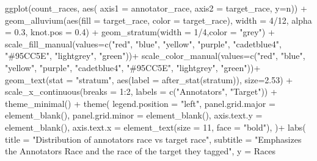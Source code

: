\documentclass[
]{article}
\newenvironment{Shaded}{\begin{snugshade}}{\end{snugshade}}
\newcommand{\AttributeTok}[1]{\textcolor[rgb]{0.77,0.63,0.00}{#1}}
\newcommand{\DecValTok}[1]{\textcolor[rgb]{0.00,0.00,0.81}{#1}}
\newcommand{\FloatTok}[1]{\textcolor[rgb]{0.00,0.00,0.81}{#1}}
\newcommand{\FunctionTok}[1]{\textcolor[rgb]{0.00,0.00,0.00}{#1}}
\newcommand{\NormalTok}[1]{#1}
\newcommand{\SpecialCharTok}[1]{\textcolor[rgb]{0.00,0.00,0.00}{#1}}
\newcommand{\StringTok}[1]{\textcolor[rgb]{0.31,0.60,0.02}{#1}}
\begin{document}
\begin{Shaded}
\begin{Highlighting}[]
\FunctionTok{ggplot}\NormalTok{(count\_races,}
       \FunctionTok{aes}\NormalTok{( }\AttributeTok{axis1 =}\NormalTok{ annotator\_race, }\AttributeTok{axis2 =}\NormalTok{ target\_race, }\AttributeTok{y=}\NormalTok{n)) }\SpecialCharTok{+}
    \FunctionTok{geom\_alluvium}\NormalTok{(}\FunctionTok{aes}\NormalTok{(}\AttributeTok{fill =}\NormalTok{ target\_race, }\AttributeTok{color =}\NormalTok{ target\_race), }
                  \AttributeTok{width =} \DecValTok{4}\SpecialCharTok{/}\DecValTok{12}\NormalTok{, }\AttributeTok{alpha =} \FloatTok{0.3}\NormalTok{, }\AttributeTok{knot.pos =} \FloatTok{0.4}\NormalTok{) }\SpecialCharTok{+}
    \FunctionTok{geom\_stratum}\NormalTok{(}\AttributeTok{width =} \DecValTok{1}\SpecialCharTok{/}\DecValTok{4}\NormalTok{,}\AttributeTok{color =} \StringTok{"grey"}\NormalTok{) }\SpecialCharTok{+}
    \FunctionTok{scale\_fill\_manual}\NormalTok{(}\AttributeTok{values=}\FunctionTok{c}\NormalTok{(}\StringTok{"red"}\NormalTok{, }\StringTok{"blue"}\NormalTok{, }\StringTok{"yellow"}\NormalTok{, }\StringTok{"purple"}\NormalTok{,}
                               \StringTok{"cadetblue4"}\NormalTok{, }\StringTok{"\#95CC5E"}\NormalTok{, }\StringTok{"lightgrey"}\NormalTok{, }\StringTok{"green"}\NormalTok{))}\SpecialCharTok{+}
    \FunctionTok{scale\_color\_manual}\NormalTok{(}\AttributeTok{values=}\FunctionTok{c}\NormalTok{(}\StringTok{"red"}\NormalTok{, }\StringTok{"blue"}\NormalTok{, }\StringTok{"yellow"}\NormalTok{, }\StringTok{"purple"}\NormalTok{,}
                                \StringTok{"cadetblue4"}\NormalTok{, }\StringTok{"\#95CC5E"}\NormalTok{, }\StringTok{"lightgrey"}\NormalTok{, }\StringTok{"green"}\NormalTok{))}\SpecialCharTok{+}
    \FunctionTok{geom\_text}\NormalTok{(}\AttributeTok{stat =} \StringTok{"stratum"}\NormalTok{, }\FunctionTok{aes}\NormalTok{(}\AttributeTok{label =} \FunctionTok{after\_stat}\NormalTok{(stratum)), }\AttributeTok{size=}\FloatTok{2.53}\NormalTok{) }\SpecialCharTok{+}
    \FunctionTok{scale\_x\_continuous}\NormalTok{(}\AttributeTok{breaks =} \DecValTok{1}\SpecialCharTok{:}\DecValTok{2}\NormalTok{, }\AttributeTok{labels =} \FunctionTok{c}\NormalTok{(}\StringTok{"Annotators"}\NormalTok{, }\StringTok{"Target"}\NormalTok{))  }\SpecialCharTok{+}
    \FunctionTok{theme\_minimal}\NormalTok{() }\SpecialCharTok{+}
    \FunctionTok{theme}\NormalTok{(}
        \AttributeTok{legend.position =} \StringTok{"left"}\NormalTok{,}
        \AttributeTok{panel.grid.major =} \FunctionTok{element\_blank}\NormalTok{(), }
        \AttributeTok{panel.grid.minor =} \FunctionTok{element\_blank}\NormalTok{(),}
        \AttributeTok{axis.text.y =} \FunctionTok{element\_blank}\NormalTok{(),}
        \AttributeTok{axis.text.x =} \FunctionTok{element\_text}\NormalTok{(}\AttributeTok{size =} \DecValTok{11}\NormalTok{, }\AttributeTok{face =} \StringTok{"bold"}\NormalTok{),}
\NormalTok{        )}\SpecialCharTok{+}
    \FunctionTok{labs}\NormalTok{(}
        \AttributeTok{title =} \StringTok{"Distribution of annotators race vs target race"}\NormalTok{,}
      \AttributeTok{subtitle =} \StringTok{"Emphasizes the Annotators Race and the race of the target they tagged"}\NormalTok{,}
      \AttributeTok{y =} \StringTok{\textquotesingle{}Races\textquotesingle{}}
      

\end{Highlighting}
\end{Shaded}
\end{document}
